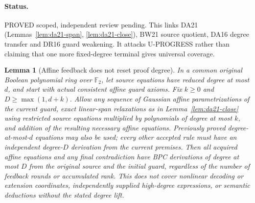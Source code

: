 \documentclass[11pt]{article}
\newtheorem{lemma}[theorem]{Lemma}
\begin{document}
\paragraph{Status.} PROVED scoped, independent review pending. This links DA21 (Lemmas~\ref{lem:da21-span}, \ref{lem:da21-close}), BW21 source quotient, DA16 degree transfer and DR16 guard weakening. It attacks U-PROGRESS rather than claiming that one more fixed-degree terminal gives universal coverage.
\begin{lemma}[Affine feedback does not reset proof degree]\label{lem:dr21-degree}
In a common original Boolean polynomial ring over $\mathbb F_2$, let source equations have reduced degree at most $d$, and start with actual consistent affine guard axioms. Fix $k\ge0$ and $D\ge\max(1,d+k)$. Allow any sequence of Gaussian affine parametrizations of the current guard, exact linear-span relaxations as in Lemma~\ref{lem:da21-close} using restricted source equations multiplied by polynomials of degree at most $k$, and addition of the resulting necessary affine equations. Previously proved degree-at-most-$d$ equations may also be used; every other accepted rule must have an independent degree-$D$ derivation from the current premises. Then all acquired affine equations and any final contradiction have BPC derivations of degree at most $D$ from the original source and the initial guard, regardless of the number of feedback rounds or accumulated rank. This does not cover nonlinear decoding or extension coordinates, independently supplied high-degree expressions, or semantic deductions without the stated degree lift.
\end{lemma}
\end{document}
